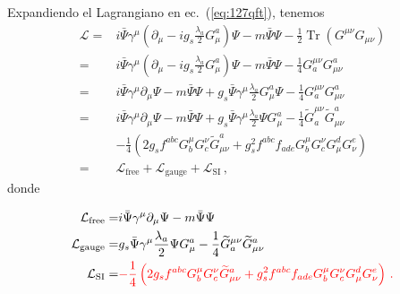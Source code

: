 \begin{frame}
Expandiendo el Lagrangiano en ec.~(\ref{eq:127qft}), tenemos
\begin{align}
  \mathcal{L}=&i\bar{\Psi}\gamma^\mu\left(\partial_\mu-i g_s\frac{\lambda_a}{2}G_\mu^a\right)\Psi
  -m\bar{\Psi}\Psi- \frac{1}{2}\operatorname{Tr}\left(G^{\mu\nu} G_{\mu\nu}\right)\nonumber\\
  =&i\bar{\Psi}\gamma^\mu\left(\partial_\mu-i g_s\frac{\lambda_a}{2}G_\mu^a\right)\Psi
  -m\bar{\Psi}\Psi- \frac{1}{4}G^{\mu\nu}_a G_{\mu\nu}^a\nonumber\\
=&i\bar{\Psi}\gamma^\mu\partial_\mu\Psi-m\bar{\Psi}\Psi+g_s\bar{\Psi}\gamma^\mu\frac{\lambda_a}{2}G_\mu^a\Psi
  - \frac{1}{4}G^{\mu\nu}_a G_{\mu\nu}^a\nonumber\\
=&i\bar{\Psi}\gamma^\mu\partial_\mu\Psi-m\bar{\Psi}\Psi+g_s\bar{\Psi}\gamma^\mu\frac{\lambda_a}{2}\Psi G_\mu^a
  - \frac{1}{4}\widetilde{G}^{\mu\nu}_a \widetilde{G}_{\mu\nu}^a\nonumber\\
  &- \frac{1}{4}\left(%
    2g_sf^{a b c}G_b^\mu G_c^\nu\widetilde{G}_{\mu\nu}^a
    +g_s^2f^{a b c}f_{a d e}G_b^\mu G_c^\nu G^d_\mu G^e_\nu\right)\nonumber\\
=&\mathcal{L}_{\text{free}}+\mathcal{L}_{\text{gauge}}+\mathcal{L}_{\text{SI}}\,,
\end{align}
donde

\begin{align}
\label{eq:qcdgauge}
\mathcal{L}_{\text{free}}=&i\bar{\Psi}\gamma^\mu\partial_\mu\Psi-m\bar{\Psi}\Psi\nonumber\\
  \mathcal{L}_{\text{gauge}}=&g_s\bar{\Psi}\gamma^\mu\frac{\lambda_a}{2}\Psi G_\mu^a
  - \frac{1}{4}\widetilde{G}^{\mu\nu}_a \widetilde{G}_{\mu\nu}^a\nonumber\\
  \mathcal{L}_{\text{SI}}=&{\color{red}- \frac{1}{4}\left(%
    2 g_sf^{a b c}G_b^\mu G_c^\nu\widetilde{G}_{\mu\nu}^a
    +g_s^2f^{a b c}f_{a d e}G_b^\mu G_c^\nu G^d_\mu G^e_\nu\right)\,.}
\end{align}


\end{frame}
